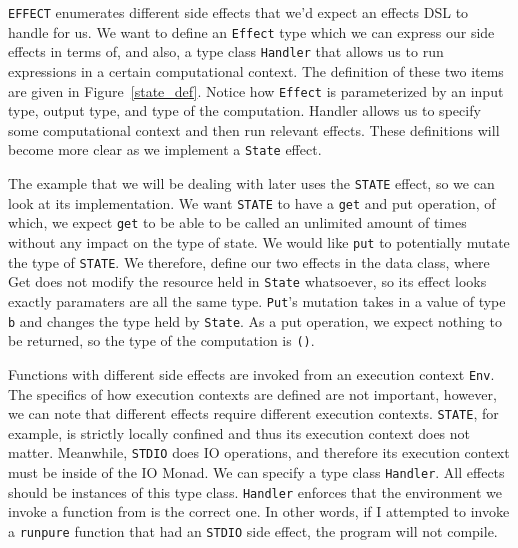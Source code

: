 \texttt{EFFECT} enumerates different side effects that we'd expect an effects
DSL to handle for us. We want to define an \texttt{Effect} type which we can
express our side effects in terms of, and also, a type class \texttt{Handler}
that allows us to run expressions in a certain computational context. The
definition of these two items are given in Figure~\ref{state_def}. Notice how
\texttt{Effect} is parameterized by an input type, output type, and type of the
computation. Handler allows us to specify some computational context and then
run relevant effects. These definitions will become more clear as we implement
a \texttt{State} effect. 

The example that we will be dealing with later uses the \texttt{STATE} effect,
so we can look at its implementation. We want \texttt{STATE} to have a
\texttt{get} and {put} operation, of which, we expect \texttt{get} to be able to
be called an unlimited amount of times without any impact on the type of state.
We would like \texttt{put} to potentially mutate the type of \texttt{STATE}. We
therefore, define our two effects in the data class, where Get does not modify
the resource held in \texttt{State} whatsoever, so its effect looks exactly
paramaters are all the same type. \texttt{Put}'s mutation takes in a value of
type \texttt{b} and changes the type held by \texttt{State}. As a put operation,
we expect nothing to be returned, so the type of the computation is \texttt{()}.

Functions with different side effects are invoked from an execution context
\texttt{Env}. The specifics of how execution contexts are defined are not
important, however, we can note that different effects require different
execution contexts. \texttt{STATE}, for example, is strictly locally confined
and thus its execution context does not matter. Meanwhile, \texttt{STDIO} does
IO operations, and therefore its execution context must be inside of the IO
Monad. We can specify a type class \texttt{Handler}. All effects should be
instances of this type class. \texttt{Handler} enforces that the environment we
invoke a function from is the correct one. In other words, if I attempted to
invoke a \texttt{runpure} function that had an \texttt{STDIO} side effect, the
program will not compile. 


